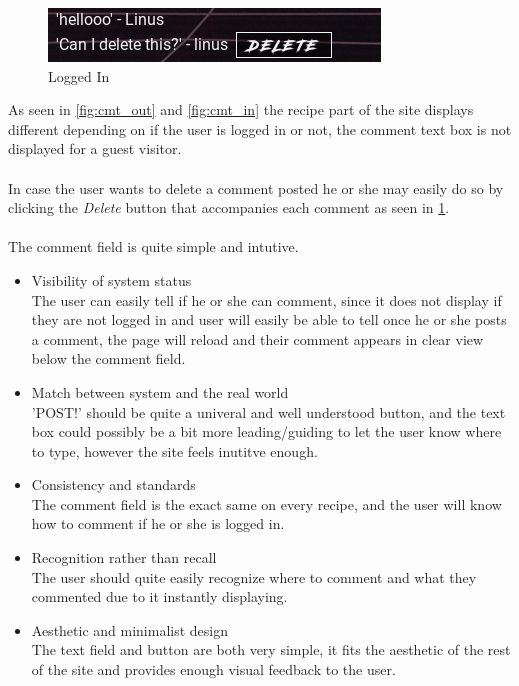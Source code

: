 \documentclass[a4paper]{scrartcl}
\begin{document}
\begin{figure}[H]
  \begin{center}
    \includegraphics[scale=1]{images/comment_delete.png}
    \caption{Logged In}
    \label{fig:cmt_del}
  \end{center}
\end{figure}

\noindent
As seen in \ref{fig:cmt_out} and \ref{fig:cmt_in} the recipe part of the site displays
different depending on if the user is logged in or not, the comment text box is not
displayed for a guest visitor.
\\\\
In case the user wants to delete a comment posted he or she may easily do so by
clicking the \textit{Delete} button that accompanies each comment as seen in \ref{fig:cmt_del}.
\\\\
\noindent
The comment field is quite simple and intutive.
\begin{itemize}
\item{Visibility of system status}\\
  The user can easily tell if he or she can comment, since it does not display
  if they are not logged in and user will easily be able to tell once he or she
  posts a comment, the page will reload and their comment appears in clear view
  below the comment field.
\item{Match between system and the real world}\\
  'POST!' should be quite a univeral and well understood button, and the text box
  could possibly be a bit more leading/guiding to let the user know where to type,
  however the site feels inutitve enough.
\item{Consistency and standards}\\
  The comment field is the exact same on every recipe, and the user will know
  how to comment if he or she is logged in.
\item{Recognition rather than recall}\\
  The user should quite easily recognize where to comment and what they commented
  due to it instantly displaying.
\item{Aesthetic and minimalist design}\\
  The text field and button are both very simple, it fits the aesthetic of the rest of the site
  and provides enough visual feedback to the user.
\end{itemize}
\end{document}

